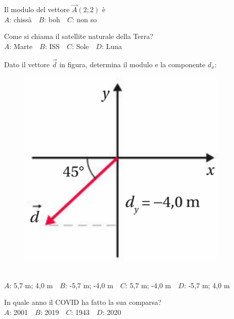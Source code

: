 \mcquestionfooter



\def\mcquestionnumber{7}


\mcquestionheader Il modulo del vettore $\vec{A}(2;2)$ è\\
{$A$}: chissà\ \ {$B$}: boh\ \ {$C$}: non so\ \ 

\mcquestionfooter



\def\mcquestionnumber{8}


\mcquestionheader Come si chiama il satellite naturale della Terra?\\
{$A$}: Marte\ \ {$B$}: ISS\ \ {$C$}: Sole\ \ {$D$}: Luna\ \ 

\mcquestionfooter



\def\mcquestionnumber{9}


\mcquestionheader Dato il vettore $\vec{d}$ in figura, determina il modulo e la componente $d_x$: \begin{figure}[h!]   \begin{center}     \includegraphics[scale=0.35]{vettored.png}   \end{center} \end{figure}\\
{$A$}: 5,7 m; 4,0 m\ \ {$B$}: -5,7 m; -4,0 m\ \ {$C$}: 5,7 m; -4,0 m\ \ {$D$}: -5,7 m; 4,0 m\ \ 

\mcquestionfooter



\def\mcquestionnumber{10}


\mcquestionheader In quale anno il COVID ha fatto la sua comparsa?\\
{$A$}: 2001\ \ {$B$}: 2019\ \ {$C$}: 1943\ \ {$D$}: 2020\ \ 

